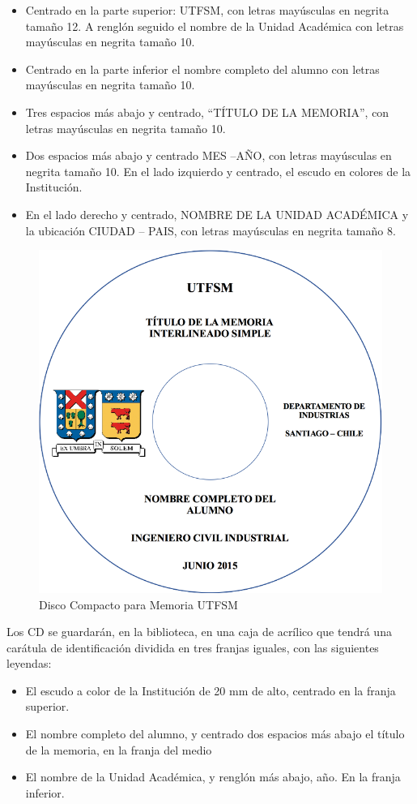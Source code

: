 \begin{itemize}
		\item
    Centrado en la parte superior: UTFSM, con letras mayúsculas en negrita tamaño 12. A renglón seguido el nombre de la Unidad Académica con letras mayúsculas en negrita tamaño 10.
		\item
    Centrado en la parte inferior el nombre completo del alumno con letras mayúsculas en negrita tamaño 10.
		\item
    Tres espacios más abajo y centrado, “TÍTULO DE LA MEMORIA”, con letras mayúsculas en negrita tamaño 10.
		\item
    Dos espacios más abajo y centrado MES –AÑO, con letras mayúsculas en negrita tamaño 10.
    En el lado izquierdo y centrado, el escudo en colores de la Institución.
		\item
    En el lado derecho y centrado, NOMBRE DE LA UNIDAD ACADÉMICA y la ubicación CIUDAD – PAIS, con letras mayúsculas en negrita tamaño 8.
\end{itemize}

\begin{figure}[ht!]
\centering
\includegraphics[width=.4\textwidth]{figures/thesis_cd.png}
\caption{Disco Compacto para Memoria UTFSM}
\label{fig:thesis_cd}
\end{figure}


Los CD se guardarán, en la biblioteca, en una caja de acrílico que tendrá una carátula de identificación dividida en tres franjas iguales, con las siguientes leyendas:
\begin{itemize}
		\item
    El escudo a color de la Institución de 20 mm de alto, centrado en la franja superior.
		\item
    El nombre completo del alumno, y centrado dos espacios más abajo el título de la memoria, en la franja del medio
		\item
    El nombre de la Unidad Académica, y renglón más abajo, año. En la franja inferior.
\end{itemize}


